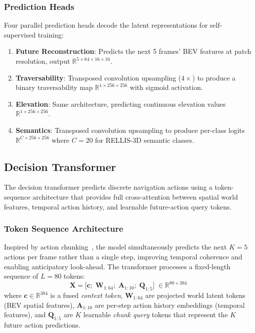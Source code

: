 \documentclass[journal]{IEEEtran}
\begin{document}
\subsubsection{Prediction Heads}
Four parallel prediction heads decode the latent representations for self-supervised training:

\begin{enumerate}
    \item \textbf{Future Reconstruction}: Predicts the next 5 frames' BEV features at patch resolution, output $\mathbb{R}^{5 \times 64 \times 16 \times 16}$.
    \item \textbf{Traversability}: Transposed convolution upsampling ($4\times$) to produce a binary traversability map $\mathbb{R}^{1 \times 256 \times 256}$ with sigmoid activation.
    \item \textbf{Elevation}: Same architecture, predicting continuous elevation values $\mathbb{R}^{1 \times 256 \times 256}$.
    \item \textbf{Semantics}: Transposed convolution upsampling to produce per-class logits $\mathbb{R}^{C \times 256 \times 256}$ where $C = 20$ for RELLIS-3D semantic classes.
\end{enumerate}

\subsection{Decision Transformer}
\label{sec:decision_transformer}

The decision transformer predicts discrete navigation actions using a token-sequence architecture that provides full cross-attention between spatial world features, temporal action history, and learnable future-action query tokens.

\subsubsection{Token Sequence Architecture}
Inspired by action chunking~\cite{zhao2023act}, the model simultaneously predicts the next $K{=}5$ actions per frame rather than a single step, improving temporal coherence and enabling anticipatory look-ahead. The transformer processes a fixed-length sequence of $L{=}80$ tokens:
\begin{equation}
    \mathbf{X} = \bigl[\mathbf{c};\;\mathbf{W}_{1:64};\;\mathbf{A}_{1:10};\;\mathbf{Q}_{1:5}\bigr]
    \;\in \mathbb{R}^{80 \times 384}
\end{equation}
where $\mathbf{c} \in \mathbb{R}^{384}$ is a fused \emph{context token}, $\mathbf{W}_{1:64}$ are projected world latent tokens (BEV spatial features), $\mathbf{A}_{1:10}$ are per-step action history embeddings (temporal features), and $\mathbf{Q}_{1:5}$ are $K$ learnable \emph{chunk query} tokens that represent the $K$ future action predictions.
\end{document}
